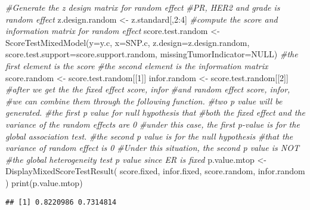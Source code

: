 \documentclass[11pt,]{article}
\newenvironment{Shaded}{\begin{snugshade}}{\end{snugshade}}
\newcommand{\AttributeTok}[1]{\textcolor[rgb]{0.77,0.63,0.00}{#1}}
\newcommand{\CommentTok}[1]{\textcolor[rgb]{0.56,0.35,0.01}{\textit{#1}}}
\newcommand{\ConstantTok}[1]{\textcolor[rgb]{0.00,0.00,0.00}{#1}}
\newcommand{\DecValTok}[1]{\textcolor[rgb]{0.00,0.00,0.81}{#1}}
\newcommand{\FunctionTok}[1]{\textcolor[rgb]{0.00,0.00,0.00}{#1}}
\newcommand{\NormalTok}[1]{#1}
\newcommand{\OtherTok}[1]{\textcolor[rgb]{0.56,0.35,0.01}{#1}}
\newcommand{\SpecialCharTok}[1]{\textcolor[rgb]{0.00,0.00,0.00}{#1}}
\begin{document}
\begin{Shaded}
\begin{Highlighting}[]
\CommentTok{\#Generate the z design matrix for random effect}
\CommentTok{\#PR, HER2 and grade is random effect}
\NormalTok{z.design.random }\OtherTok{\textless{}{-}}\NormalTok{ z.standard[,}\DecValTok{2}\SpecialCharTok{:}\DecValTok{4}\NormalTok{]}
\CommentTok{\#compute the score and information matrix for random effect}
\NormalTok{score.test.random }\OtherTok{\textless{}{-}} \FunctionTok{ScoreTestMixedModel}\NormalTok{(}\AttributeTok{y=}\NormalTok{y.c,}
                                         \AttributeTok{x=}\NormalTok{SNP.c,}
                                         \AttributeTok{z.design=}\NormalTok{z.design.random,}
                                         \AttributeTok{score.test.support=}\NormalTok{score.support.random,}
                                         \AttributeTok{missingTumorIndicator=}\ConstantTok{NULL}\NormalTok{)}
\CommentTok{\#the first element is the score}
\CommentTok{\#the second element is the information matrix}
\NormalTok{score.random }\OtherTok{\textless{}{-}}\NormalTok{ score.test.random[[}\DecValTok{1}\NormalTok{]]}
\NormalTok{infor.random }\OtherTok{\textless{}{-}}\NormalTok{ score.test.random[[}\DecValTok{2}\NormalTok{]]}
\CommentTok{\#after we get the the fixed effect score, infor }
\CommentTok{\#and random effect score, infor, }
\CommentTok{\#we can combine them through the following function. }
\CommentTok{\#two p value will be generated.}
\CommentTok{\#the first p value for null hypothesis that}
\CommentTok{\#both the fixed effect and the variance of the random effects are 0}
\CommentTok{\#under this case, the first p{-}value is for the global association test.}
\CommentTok{\#the second p value is for the null hypothesis }
\CommentTok{\#that the variance of random effect is 0}
\CommentTok{\#Under this situation, the second p value is NOT }
\CommentTok{\#the global heterogeneity test p value since ER is fixed}
\NormalTok{p.value.mtop }\OtherTok{\textless{}{-}} \FunctionTok{DisplayMixedScoreTestResult}\NormalTok{(}
\NormalTok{  score.fixed,}
\NormalTok{  infor.fixed,}
\NormalTok{  score.random,}
\NormalTok{  infor.random}
\NormalTok{)  }
\FunctionTok{print}\NormalTok{(p.value.mtop)}
\end{Highlighting}
\end{Shaded}

\begin{verbatim}
## [1] 0.8220986 0.7314814
\end{verbatim}
\end{document}
